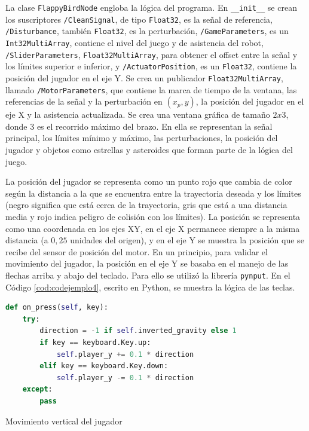 La clase \verb|FlappyBirdNode| engloba la lógica del programa.
En \verb|__init__| se crean los suscriptores \verb|/CleanSignal|, de tipo \verb|Float32|, es la señal de referencia, \verb|/Disturbance|, también \verb|Float32|, es la perturbación, \verb|/GameParameters|, es un \verb|Int32MultiArray|, contiene el nivel del juego y de asistencia del robot, \verb|/SliderParameters|, \verb|Float32MultiArray|, para obtener el offset entre la señal y los límites superior e inferior, y \verb|/ActuatorPosition|, es un \verb|Float32|, contiene la posición del jugador en el eje Y.
Se crea un publicador \verb|Float32MultiArray|, llamado \verb|/MotorParameters|, que contiene la marca de tiempo de la ventana, las referencias de la señal y la perturbación en $(x_p, y)$, la posición del jugador en el eje X y la asistencia actualizada.
Se crea una ventana gráfica de tamaño $2x3$, donde 3 es el recorrido máximo del brazo.
En ella se representan la señal principal, los límites mínimo y máximo, las perturbaciones, la posición del jugador y objetos como estrellas y asteroides que forman parte de la lógica del juego.

La posición del jugador se representa como un punto rojo que cambia de color según la distancia a la que se encuentra entre la trayectoria deseada y los límites (negro significa que está cerca de la trayectoria, gris que está a una distancia media y rojo indica peligro de colisión con los límites).
La posición se representa como una coordenada en los ejes XY, en el eje X permanece siempre a la misma distancia (a $0,25$ unidades del origen), y en el eje Y se muestra la posición que se recibe del sensor de posición del motor.
En un principio, para validar el movimiento del jugador, la posición en el eje Y se basaba en el manejo de las flechas arriba y abajo del teclado.
Para ello se utilizó la librería \verb|pynput|.
En el Código \ref{cod:codejemplo4}, escrito en Python, se muestra la lógica de las teclas.

\begin{code}[h]
\begin{lstlisting}[language=Python]
def on_press(self, key):
	try:
		direction = -1 if self.inverted_gravity else 1
		if key == keyboard.Key.up:
			self.player_y += 0.1 * direction
		elif key == keyboard.Key.down:
			self.player_y -= 0.1 * direction
	except:
		pass
\end{lstlisting}
\caption[Movimiento vertical del jugador]{Movimiento vertical del jugador}
\label{cod:codejemplo4}
\end{code}

